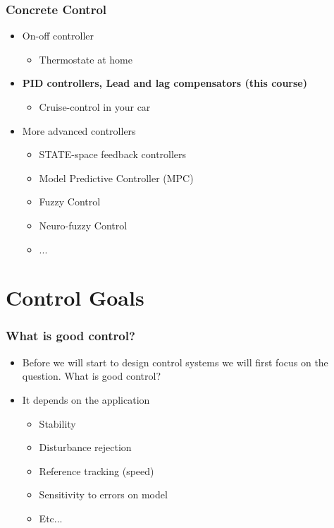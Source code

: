 \begin{frame}
	\frametitle{Concrete Control}
	\begin{itemize}
		\item On-off controller
		\begin{itemize}
			\item Thermostate at home
		\end{itemize}
		\item \textbf{PID controllers, Lead and lag compensators (this course)}
		\begin{itemize}
			\item Cruise-control in your car
		\end{itemize}
		\item More advanced controllers
		\begin{itemize}
			\item STATE-space feedback controllers
			\item Model Predictive Controller (MPC)
			\item Fuzzy Control
			\item Neuro-fuzzy Control
			\item ...
		\end{itemize}
	\end{itemize}
\end{frame}


\section{Control Goals}
\begin{frame}
	\frametitle{What is good control?}
	\begin{itemize}
		\item Before we will start to design control systems we will first focus on the question. What is good control?
		\item It depends on the application
		\begin{itemize}
			\item Stability
			\item Disturbance rejection
			\item Reference tracking (speed)
			\item Sensitivity to errors on model
			\item Etc...
		\end{itemize}
	\end{itemize}
\end{frame}